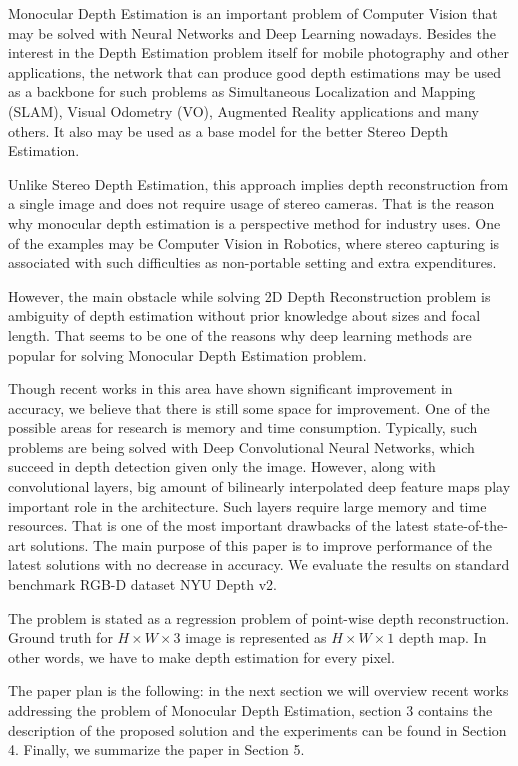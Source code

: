 \documentclass[10pt,twocolumn,letterpaper]{article}
\begin{document}
Monocular Depth Estimation is an important problem of Computer Vision that may be solved with Neural Networks and Deep Learning nowadays. Besides the interest in the Depth Estimation problem itself for mobile photography and other applications, the network that can produce good depth estimations may be used as a backbone for such problems as Simultaneous Localization and Mapping (SLAM), Visual Odometry (VO), Augmented Reality applications and many others. It also may be used as a base model for the better Stereo Depth Estimation.

Unlike Stereo Depth Estimation, this approach implies depth reconstruction from a single image and does not require usage of stereo cameras. That is the reason why monocular depth estimation is a perspective method for industry uses. One of the examples may be Computer Vision in Robotics, where stereo capturing is associated with such difficulties as non-portable setting and extra expenditures.

However, the main obstacle while solving 2D Depth Reconstruction problem is ambiguity of depth estimation without prior knowledge about sizes and focal length. That seems to be one of the reasons why deep learning methods are popular for solving Monocular Depth Estimation problem.

Though recent works in this area have shown significant improvement in accuracy, we believe that there is still some space for improvement. One of the possible areas for research is memory and time consumption. Typically, such problems are being solved with Deep Convolutional Neural Networks, which succeed in depth detection given only the image. However, along with convolutional layers, big amount of bilinearly interpolated deep feature maps play important role in the architecture. Such layers require large memory and time resources. That is one of the most important drawbacks of the latest state-of-the-art solutions. The main purpose of this paper is to improve performance of the latest solutions with no decrease in accuracy. We evaluate the results on standard benchmark RGB-D dataset NYU Depth v2.

The problem is stated as a regression problem of point-wise depth reconstruction. Ground truth for $H \times W \times 3$ image is represented as $H \times W \times 1$ depth map. In other words, we have to make depth estimation for every pixel.

The paper plan is the following: in the next section we will overview recent works addressing the problem of Monocular Depth Estimation, section 3 contains the description of the proposed solution and the experiments can be found in Section 4. Finally, we summarize the paper in Section 5.
\end{document}
